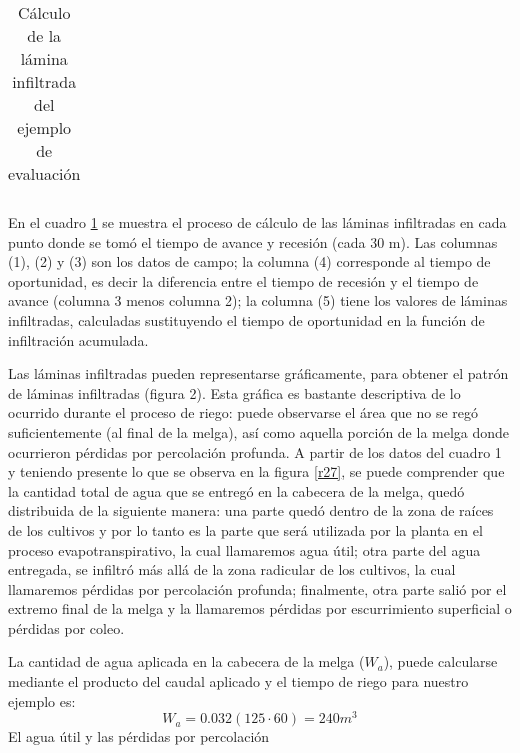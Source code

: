 \begin{example}
\begin{table}[h!]
\begin{tabular}{@{}ccccc@{}}
    \end{tabular}
    \caption{Cálculo de la lámina infiltrada del ejemplo de evaluación}
    \label{tabr8}
    \end{table}
\begin{example}
En el cuadro \ref{tabr8} se muestra el proceso de cálculo de las láminas infiltradas en cada punto donde se tomó el tiempo de avance y recesión (cada 30 m). Las columnas (1), (2) y (3) son los datos de campo; la columna (4) corresponde al tiempo de oportunidad, es decir la diferencia entre el tiempo de recesión y el tiempo de avance (columna 3 menos columna 2); la columna (5) tiene los valores de láminas infiltradas, calculadas sustituyendo el tiempo de oportunidad en la función de infiltración acumulada.

Las láminas infiltradas pueden representarse gráficamente, para obtener el patrón de láminas infiltradas (figura 2). Esta gráfica es bastante descriptiva de lo ocurrido durante el proceso de riego: puede observarse el área que no se regó suficientemente (al final de la melga), así como aquella porción de la melga donde ocurrieron pérdidas por percolación profunda.
A partir de los datos del cuadro 1 y teniendo presente lo que se observa en la figura \ref{r27}, se puede comprender que la cantidad total de agua que se entregó en la cabecera de la melga, quedó distribuida de la siguiente manera: una parte quedó dentro de la zona de raíces de los cultivos y por lo tanto es la parte que será utilizada por la planta en el proceso evapotranspirativo, la cual llamaremos agua útil; otra parte del agua entregada, se infiltró más allá de la zona radicular de los cultivos, la cual llamaremos pérdidas por percolación profunda; finalmente, otra parte salió por el extremo final de la melga y la llamaremos pérdidas por escurrimiento superficial o pérdidas por coleo.
\end{example}
La cantidad de agua aplicada en la cabecera de la melga ($W_a$), puede calcularse mediante el producto del caudal aplicado y el tiempo de riego para nuestro ejemplo es:
\begin{equation*}
    W_a = 0.032 (125 \cdot 60) = 240 m^3
\end{equation*}
El agua útil y las pérdidas por percolación


\end{example}
